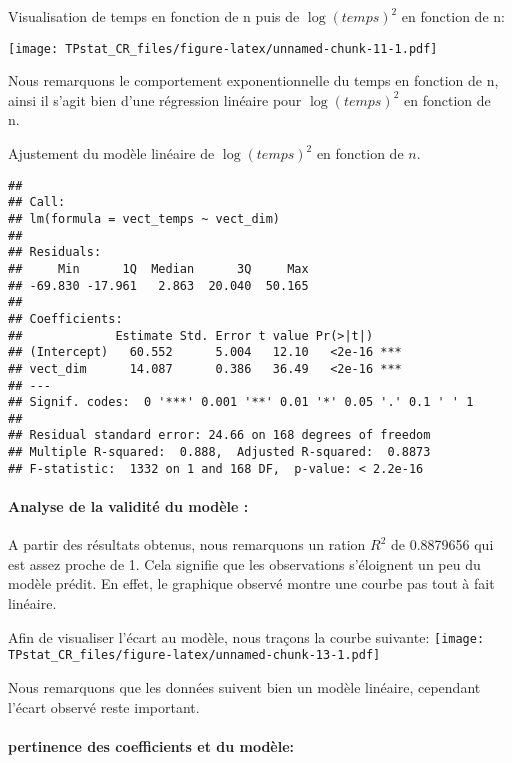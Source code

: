 \documentclass[
]{article}
\begin{document}
Visualisation de temps en fonction de n puis de \(\log(temps)^2\) en
fonction de n:

\texttt{[image: TPstat\_CR\_files/figure-latex/unnamed-chunk-11-1.pdf]}

Nous remarquons le comportement exponentionnelle du temps en fonction de
n, ainsi il s'agit bien d'une régression linéaire pour \(\log(temps)^2\)
en fonction de n.~

Ajustement du modèle linéaire de \(\log(temps)^2\) en fonction de \(n\).

\begin{verbatim}
## 
## Call:
## lm(formula = vect_temps ~ vect_dim)
## 
## Residuals:
##     Min      1Q  Median      3Q     Max 
## -69.830 -17.961   2.863  20.040  50.165 
## 
## Coefficients:
##             Estimate Std. Error t value Pr(>|t|)    
## (Intercept)   60.552      5.004   12.10   <2e-16 ***
## vect_dim      14.087      0.386   36.49   <2e-16 ***
## ---
## Signif. codes:  0 '***' 0.001 '**' 0.01 '*' 0.05 '.' 0.1 ' ' 1
## 
## Residual standard error: 24.66 on 168 degrees of freedom
## Multiple R-squared:  0.888,  Adjusted R-squared:  0.8873 
## F-statistic:  1332 on 1 and 168 DF,  p-value: < 2.2e-16
\end{verbatim}

\hypertarget{analyse-de-la-validituxe9-du-moduxe8le}{%
\paragraph{Analyse de la validité du modèle
:}\label{analyse-de-la-validituxe9-du-moduxe8le}}

A partir des résultats obtenus, nous remarquons un ration \(R^2\) de
0.8879656 qui est assez proche de 1. Cela signifie que les observations
s'éloignent un peu du modèle prédit. En effet, le graphique observé
montre une courbe pas tout à fait linéaire.

Afin de visualiser l'écart au modèle, nous traçons la courbe suivante:
\texttt{[image: TPstat\_CR\_files/figure-latex/unnamed-chunk-13-1.pdf]}

Nous remarquons que les données suivent bien un modèle linéaire,
cependant l'écart observé reste important.

\hypertarget{pertinence-des-coefficients-et-du-moduxe8le}{%
\paragraph{pertinence des coefficients et du
modèle:}\label{pertinence-des-coefficients-et-du-moduxe8le}}
\end{document}
